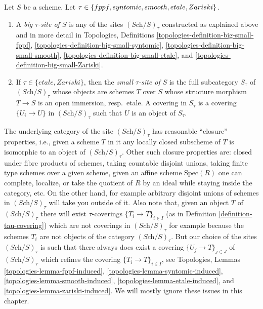 \begin{definition}
\label{definition-tau-site}
Let $S$ be a scheme.
Let $\tau \in \{fppf, syntomic, smooth, etale,\linebreak[0] Zariski\}$.
\begin{enumerate}
\item A {\it big $\tau$-site of $S$} is any of the sites
$(\textit{Sch}/S)_\tau$ constructed as explained above and in more detail in
Topologies, Definitions
\ref{topologies-definition-big-small-fppf},
\ref{topologies-definition-big-small-syntomic},
\ref{topologies-definition-big-small-smooth},
\ref{topologies-definition-big-small-etale}, and
\ref{topologies-definition-big-small-Zariski}.
\item If $\tau \in \{etale, Zariski\}$, then the {\it small $\tau$-site of $S$}
is the full subcategory $S_\tau$ of $(\textit{Sch}/S)_\tau$ whose objects
are schemes $T$ over $S$ whose structure morphism $T \to S$ is an open
immersion, resp.\ etale. A covering in $S_\tau$ is a covering
$\{U_i \to U\}$ in $(\textit{Sch}/S)_\tau$
such that $U$ is an object of $S_\tau$.
\end{enumerate}
\end{definition}

\noindent
The underlying category of the site $(\textit{Sch}/S)_\tau$ has reasonable
``closure'' properties, i.e., given a scheme $T$ in it any locally closed
subscheme of $T$ is isomorphic to an object of $(\textit{Sch}/S)_\tau$.
Other such closure properties are: closed under fibre products of schemes,
taking countable disjoint unions,
taking finite type schemes over a given scheme, given an affine scheme
$\text{Spec}(R)$ one can complete, localize, or take the quotient of $R$
by an ideal while staying inside the category, etc.
On the other hand, for example arbitrary disjoint unions
of schemes in $(\textit{Sch}/S)_\tau$ will take you outside of it.
Also note that, given an object $T$ of $(\textit{Sch}/S)_\tau$ there will exist
$\tau$-coverings $\{T_i \to T\}_{i \in I}$ (as in
Definition \ref{definition-tau-covering})
which are not coverings in $(\textit{Sch}/S)_\tau$ for example
because the schemes $T_i$ are not objects of the category
$(\textit{Sch}/S)_\tau$. But our choice of the sites $(\textit{Sch}/S)_\tau$
is such that there always does exist
a covering $\{U_j \to T\}_{j \in J}$ of $(\textit{Sch}/S)_\tau$ which refines
the covering $\{T_i \to T\}_{i \in I}$, see
Topologies, Lemmas
\ref{topologies-lemma-fppf-induced},
\ref{topologies-lemma-syntomic-induced},
\ref{topologies-lemma-smooth-induced},
\ref{topologies-lemma-etale-induced}, and
\ref{topologies-lemma-zariski-induced}.
We will mostly ignore these issues in this chapter.

